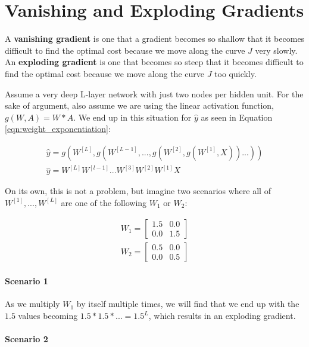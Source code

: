 \documentclass{article}
\begin{document}
\section{Vanishing and Exploding Gradients}

A \textbf{vanishing gradient} is one that a gradient becomes so shallow that it becomes difficult to find the optimal cost because we move along the curve $J$ very slowly.  An \textbf{exploding gradient} is one that becomes so steep that it becomes difficult to find the optimal cost because we move along the curve $J$ too quickly.

Assume a very deep L-layer network with just two nodes per hidden unit.  For the sake of argument, also assume we are using the linear activation function, $g(W, A) = W * A$.  We end up in this situation for $\hat{y}$ as seen in Equation \ref{eqn:weight_exponentiation}:

\begin{gather}
\hat{y} = g(W^{[L]}, g(W^{[L-1]}, ..., g(W^{[2]}, g(W^{[1]}, X))...)) \\
\hat{y} = W^{[L]} W^{[l-1]} ... W^{[3]} W^{[2]} W^{[1]} X \label{eqn:weight_exponentiation}
\end{gather}

On its own, this is not a problem, but imagine two scenarios where all of $W^{[1]}, ..., W^{[L]}$ are one of the following $W_1$ or $W_2$:

\begin{gather}
W_1 = \begin{bmatrix}
1.5 & 0.0 \\
0.0 & 1.5
\end{bmatrix} \\
%
W_2 = \begin{bmatrix}
0.5 & 0.0 \\
0.0 & 0.5
\end{bmatrix}
\end{gather}

\paragraph{Scenario 1}

As we multiply $W_1$ by itself multiple times, we will find that we end up with the $1.5$ values becoming $1.5 * 1.5 * ... = 1.5^L$, which results in an exploding gradient.

\paragraph{Scenario 2}
\end{document}
